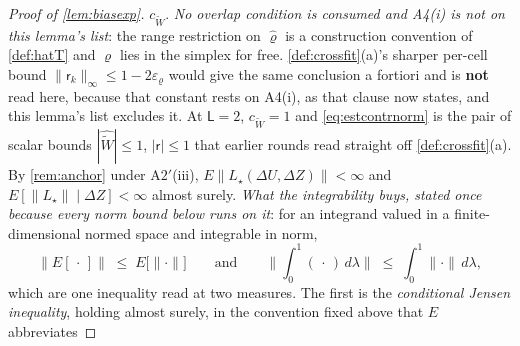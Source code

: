 \begin{proof}[Proof of \cref{lem:biasexp}]
$c_{\widetilde W}$. \emph{No overlap condition is consumed and A4(i) is not on this lemma's list}:
the range restriction on $\hat\varrho$ is a construction convention of \cref{def:hatT} and $\varrho$ lies
in the simplex for free. \cref{def:crossfit}\textup{(a)}'s sharper per-cell bound
$\|\mathsf r_k\|_\infty\le1-2\varepsilon_\varrho$ would give the same conclusion a fortiori and is
\textbf{not} read here, because that constant rests on A4(i), as that clause now states, and this
lemma's list excludes it.
At $\mathsf L=2$, $c_{\widetilde W}=1$ and \eqref{eq:estcontrnorm} is the pair of scalar bounds
$|\widehat{\widetilde W}|\le1$, $|\mathsf r|\le1$ that earlier rounds read straight off
\cref{def:crossfit}\textup{(a)}. By \cref{rem:anchor} under
A$2'$(iii), $E\|L_\star(\Delta U,\Delta Z)\|<\infty$ and $E[\|L_\star\|\mid\Delta Z]<\infty$ almost surely.
\emph{What the integrability buys, stated once because every norm bound below runs on it}: for an
integrand valued in a finite-dimensional normed space and integrable in norm,
\[
\big\|E[\,\cdot\,]\big\|\;\le\;E\big[\|\cdot\|\big]
\qquad\text{and}\qquad
\Big\|\int_0^1(\,\cdot\,)\,d\lambda\Big\|\;\le\;\int_0^1\|\cdot\|\,d\lambda ,
\]
which are one inequality read at two measures. The first is the \emph{conditional Jensen inequality},
holding almost surely, in the convention fixed above that $E$ abbreviates

\end{proof}
